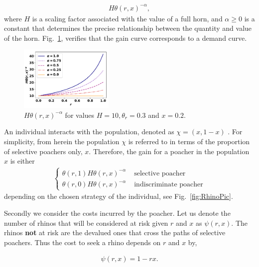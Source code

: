 \documentclass[10pt]{article}
\begin{document}
\begin{eqnarray}
    \label{eqn:individual_gain}
    H \theta(r, x)^{-\alpha},
\end{eqnarray}
where \(H\) is a scaling factor associated with the value of a full horn, and
\(\alpha \geq 0\) is a constant that determines the precise relationship between
the quantity and value of the horn.  Fig.~\ref{fig:GainCurve}, verifies that the
gain curve corresponds to a demand curve.

\begin{figure}[!htbp]
\centering
\includegraphics[width=0.4\textwidth]{images/gain_curve.pdf}
\caption{\label{fig:GainCurve} \(H \theta(r, x) ^{- \alpha}\) for values
\(H = 10, \theta_r = 0.3\) and \(x = 0.2.\)}
\end{figure}

An individual interacts with the population, denoted as \(\chi=(x,1-x)\) .
For simplicity, from herein the population \(\chi\) is referred to in terms
of the proportion of selective poachers only, \(x\). 
Therefore, the gain for a poacher in the population \(x\) is either
\begin{eqnarray}
    \label{eqn:gain}
    \left\{
    \begin{array}{cl}
    \theta(r, 1) H \theta(r, x)^{-\alpha} & \mbox{ selective poacher}
    \\
    \theta(r, 0) H \theta(r, x)^{-\alpha} & \mbox{ indiscriminate poacher}
    \end{array} \right.
\end{eqnarray}
depending on the chosen strategy of the individual, see Fig.~\ref{fig:RhinoPic}.

Secondly we consider the costs incurred by the poacher. Let us denote the number
of rhinos that will be considered at risk given \(r\) and \(x\) as \(\psi(r, x)\).
The rhinos \textbf{not} at risk are the devalued ones 
that cross the paths of selective poachers. Thus the cost to seek a rhino depends
on \(r\) and \(x\) by,

\begin{eqnarray}
    \label{eqn:psi}
    \psi(r, x) = 1 - rx.
\end{eqnarray}
\end{document}
